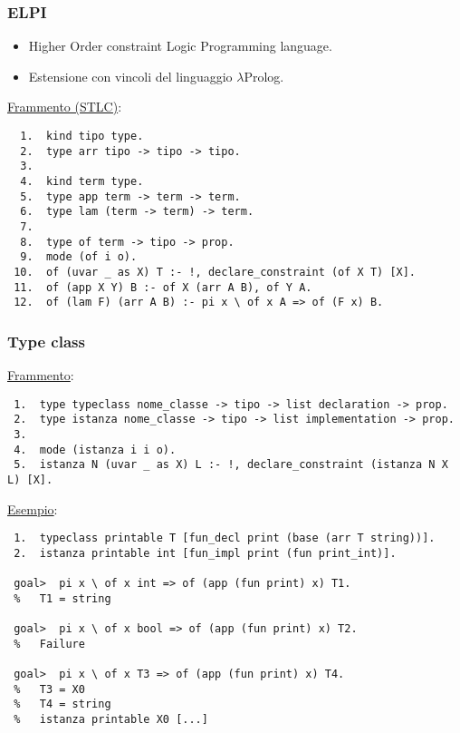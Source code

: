 \documentclass{beamer}
\begin{document}
\begin{frame}[fragile=singleslide]      %

 \frametitle{ELPI}

 \begin{itemize}
  \item Higher Order constraint Logic Programming language.
  \item Estensione con vincoli del linguaggio $\lambda$Prolog.
 \end{itemize}

 \vfill
 
 \underline{Frammento (STLC)}:
 \begin{verbatim}
  1.  kind tipo type.
  2.  type arr tipo -> tipo -> tipo.
  3.
  4.  kind term type.
  5.  type app term -> term -> term.
  6.  type lam (term -> term) -> term.
  7.
  8.  type of term -> tipo -> prop.
  9.  mode (of i o).
 10.  of (uvar _ as X) T :- !, declare_constraint (of X T) [X].
 11.  of (app X Y) B :- of X (arr A B), of Y A.
 12.  of (lam F) (arr A B) :- pi x \ of x A => of (F x) B.
 \end{verbatim}

\end{frame}


\begin{frame}[fragile=singleslide]      %
 
 \frametitle{Type class}

 \underline{Frammento}:
 \begin{verbatim}
 1.  type typeclass nome_classe -> tipo -> list declaration -> prop.
 2.  type istanza nome_classe -> tipo -> list implementation -> prop.
 3.
 4.  mode (istanza i i o).
 5.  istanza N (uvar _ as X) L :- !, declare_constraint (istanza N X L) [X].
 \end{verbatim}

 \vfill

 \underline{Esempio}:
 \begin{verbatim}
 1.  typeclass printable T [fun_decl print (base (arr T string))].
 2.  istanza printable int [fun_impl print (fun print_int)].

 goal>  pi x \ of x int => of (app (fun print) x) T1.
 %   T1 = string

 goal>  pi x \ of x bool => of (app (fun print) x) T2.
 %   Failure

 goal>  pi x \ of x T3 => of (app (fun print) x) T4.
 %   T3 = X0
 %   T4 = string
 %   istanza printable X0 [...]
 \end{verbatim}

\end{frame}
\end{document}
